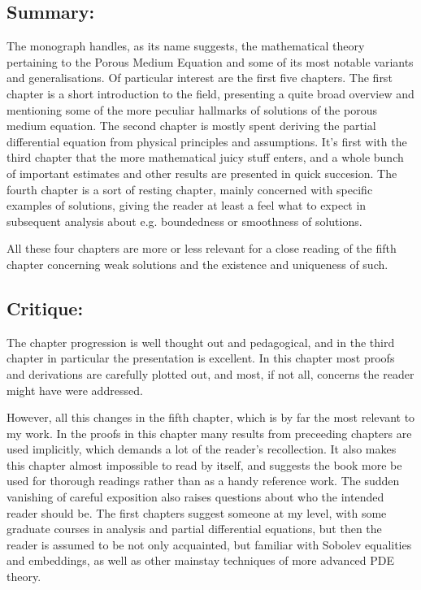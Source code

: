 \documentclass[11pt, a4paper]{article}
\begin{document}
\subsection{Summary:}
The monograph \cite{vazquez2007porous} handles, as its name suggests, the mathematical theory pertaining to the Porous Medium Equation and some of its most notable variants and generalisations. Of particular interest are the first five chapters. The first chapter is a short introduction to the field, presenting a quite broad overview and mentioning some of the more peculiar hallmarks of solutions of the porous medium equation. The second chapter is mostly spent deriving the partial differential equation from physical principles and assumptions. It's first with the third chapter that the more mathematical juicy stuff enters, and a whole bunch of important estimates and other results are presented in quick succesion. The fourth chapter is a sort of resting chapter, mainly concerned with specific examples of solutions, giving the reader at least a feel what to expect in subsequent analysis about e.g. boundedness or smoothness of solutions.

All these four chapters are more or less relevant for a close reading of the fifth chapter concerning weak solutions and the existence and uniqueness of such. 

\subsection{Critique:}
The chapter progression is well thought out and pedagogical, and in the third chapter in particular the presentation is excellent. In this chapter most proofs and derivations are carefully plotted out, and most, if not all, concerns the reader might have were addressed.

However, all this changes in the fifth chapter, which is by far the most relevant to my work. In the proofs in this chapter many results from preceeding chapters are used implicitly, which demands a lot of the reader's recollection. It also makes this chapter almost impossible to read by itself, and suggests the book more be used for thorough readings rather than as a handy reference work. The sudden vanishing of careful exposition also raises questions about who the intended reader should be. The first chapters suggest someone at my level, with some graduate courses in analysis and partial differential equations, but then the reader is assumed to be not only acquainted, but familiar with Sobolev equalities and embeddings, as well as other mainstay techniques of more advanced PDE theory.
\end{document}
